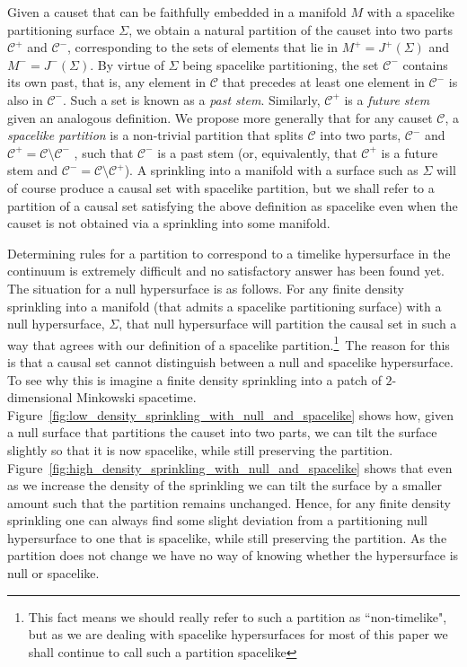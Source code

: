 \documentclass[12pt]{article}
\newcommand{\IGNORE}[1]{}
\begin{document}
Given a causet that can be faithfully embedded in a manifold $M$ with a spacelike partitioning surface $\Sigma$, we obtain a natural partition of the causet into two parts $\mathcal{C}^+$ and $\mathcal{C}^-$, corresponding to the sets of elements that lie in $M^+=J^+(\Sigma)$ and $M^-=J^-(\Sigma)$. By virtue of $\Sigma$ being spacelike partitioning, the set $\mathcal C^-$ contains its own past, that is, any element in $\mathcal C$ that precedes at least one element in $\mathcal{C}^-$ is also in $\mathcal{C}^-$. Such a set is known as a \emph{past stem}. Similarly, $\mathcal C^+$ is a \emph{future stem} given an analogous definition. We propose more generally that for any causet $\mathcal C$, a \emph{spacelike partition} is a non-trivial partition that splits $\mathcal{C}$ into two parts, $\mathcal{C}^-$ and $\mathcal{C}^+=\mathcal{C}\setminus\mathcal{C}^-$ \IGNORE{($\mathcal{C}=\mathcal{C}^-\cup\mathcal{C}^+$)}, such that $\mathcal{C}^-$ is a past stem (or, equivalently, that $\mathcal{C}^+$ is a future stem and $\mathcal{C}^- = \mathcal{C}\setminus\mathcal{C}^+$). A sprinkling into a manifold with a surface such as $\Sigma$ will of course produce a causal set with spacelike partition, but we shall refer to a partition of a causal set satisfying the above definition as spacelike even when the causet is not obtained via a sprinkling into some manifold.

Determining rules for a partition to correspond to a timelike hypersurface in the continuum is extremely difficult and no satisfactory answer has been found yet. The situation for a null hypersurface is as follows. For any finite density sprinkling into a manifold (that admits a spacelike partitioning surface) with a null hypersurface, $\Sigma$, that null hypersurface will partition the causal set in such a way that agrees with our definition of a spacelike partition.\footnote{This fact means we should really refer to such a partition as ``non-timelike", but as we are dealing with spacelike hypersurfaces for most of this paper we shall continue to call such a partition spacelike}~The reason for this is that a causal set cannot distinguish between a null and spacelike hypersurface. To see why this is imagine a finite density sprinkling into a patch of $2$-dimensional Minkowski spacetime. Figure~\ref{fig:low_density_sprinkling_with_null_and_spacelike} shows how, given a null surface that partitions the causet into two parts, we can tilt the surface slightly so that it is now spacelike, while still preserving the partition. Figure~\ref{fig:high_density_sprinkling_with_null_and_spacelike} shows that even as we increase the density of the sprinkling we can tilt the surface by a smaller amount such that the partition remains unchanged. Hence, for any finite density sprinkling one can always find some slight deviation from a partitioning null hypersurface to one that is spacelike, while still preserving the partition. As the partition does not change we have no way of knowing whether the hypersurface is null or spacelike.
\end{document}
